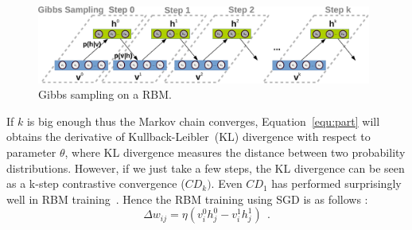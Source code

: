 \begin{figure}[hbt]
	\centering
	\includegraphics[width=0.98\textwidth]{pics_sdlm/gibbs_sampling.pdf}
	\caption{Gibbs sampling on a RBM.}
	\label{fig:gibbs}
\end{figure}

If $ k $ is big enough thus the Markov chain converges, Equation~\ref{equ:part} will obtains the derivative of Kullback-Leibler~(KL) divergence with respect to parameter $\theta$, where KL divergence measures the distance between two probability distributions.
However, if we just take a few steps, the KL divergence can be seen as a k-step contrastive convergence ($ CD_{k}) $.
Even $ CD_1 $ has performed surprisingly well in RBM training~\cite{hinton2002training}.
Hence the RBM training using SGD is as follows :
\begin{equation}
\Delta w_{ij} = \eta (v^0_i h^0_j-v^1_i h^1_j)~~.
\label{equ:rbm_train}
\end{equation}



